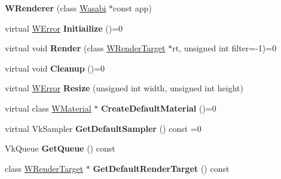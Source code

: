 \begin{DoxyCompactItemize}
\item 
{\bfseries W\+Renderer} (class \hyperlink{class_wasabi}{Wasabi} $\ast$const app)\hypertarget{class_w_renderer_a0058086266c668315984d03b150e80ad}{}\label{class_w_renderer_a0058086266c668315984d03b150e80ad}

\item 
virtual \hyperlink{class_w_error}{W\+Error} {\bfseries Initiailize} ()=0\hypertarget{class_w_renderer_ab6595c2f3cbabb322d7e189c8cb5a649}{}\label{class_w_renderer_ab6595c2f3cbabb322d7e189c8cb5a649}

\item 
virtual void {\bfseries Render} (class \hyperlink{class_w_render_target}{W\+Render\+Target} $\ast$rt, unsigned int filter=-\/1)=0\hypertarget{class_w_renderer_af4c7b8549a4f688cfd5f0c5604845052}{}\label{class_w_renderer_af4c7b8549a4f688cfd5f0c5604845052}

\item 
virtual void {\bfseries Cleanup} ()=0\hypertarget{class_w_renderer_aae1e6146c3d77c98b3283913ec094318}{}\label{class_w_renderer_aae1e6146c3d77c98b3283913ec094318}

\item 
virtual \hyperlink{class_w_error}{W\+Error} {\bfseries Resize} (unsigned int width, unsigned int height)\hypertarget{class_w_renderer_af4a25acc15b0d53b7d3ee18c69561793}{}\label{class_w_renderer_af4a25acc15b0d53b7d3ee18c69561793}

\item 
virtual class \hyperlink{class_w_material}{W\+Material} $\ast$ {\bfseries Create\+Default\+Material} ()=0\hypertarget{class_w_renderer_ad9b930c45f30ca70438e8d6e41417ead}{}\label{class_w_renderer_ad9b930c45f30ca70438e8d6e41417ead}

\item 
virtual Vk\+Sampler {\bfseries Get\+Default\+Sampler} () const  =0\hypertarget{class_w_renderer_a503d5eb3ea9822b57bd9039374bf98db}{}\label{class_w_renderer_a503d5eb3ea9822b57bd9039374bf98db}

\item 
Vk\+Queue {\bfseries Get\+Queue} () const \hypertarget{class_w_renderer_a64128aa71ecea0a3098d39c03d2f07ba}{}\label{class_w_renderer_a64128aa71ecea0a3098d39c03d2f07ba}

\item 
class \hyperlink{class_w_render_target}{W\+Render\+Target} $\ast$ {\bfseries Get\+Default\+Render\+Target} () const \hypertarget{class_w_renderer_a95b12ab212008a191e328d85dc6fbf15}{}\label{class_w_renderer_a95b12ab212008a191e328d85dc6fbf15}

\end{DoxyCompactItemize}
